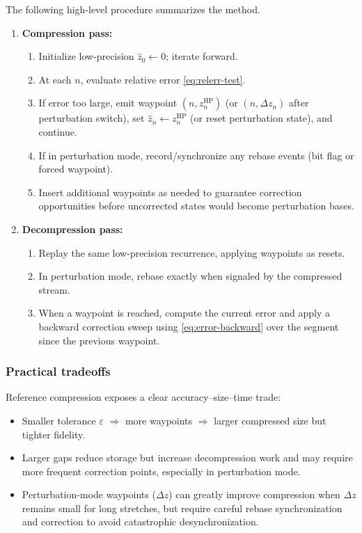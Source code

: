 The following high-level procedure summarizes the method.

\begin{enumerate}
  \item \textbf{Compression pass:}
    \begin{enumerate}
      \item Initialize low-precision \(\hat z_0 \leftarrow 0\); iterate forward.
      \item At each \(n\), evaluate relative error \eqref{eq:relerr-test}.
      \item If error too large, emit waypoint \((n, z_n^{\mathrm{HP}})\) (or \((n,\Delta z_n)\) after perturbation switch),
            set \(\hat z_n \leftarrow z_n^{\mathrm{HP}}\) (or reset perturbation state), and continue.
      \item If in perturbation mode, record/synchronize any rebase events (bit flag or forced waypoint).
      \item Insert additional waypoints as needed to guarantee correction opportunities before uncorrected
            states would become perturbation bases.
    \end{enumerate}

  \item \textbf{Decompression pass:}
    \begin{enumerate}
      \item Replay the same low-precision recurrence, applying waypoints as resets.
      \item In perturbation mode, rebase exactly when signaled by the compressed stream.
      \item When a waypoint is reached, compute the current error and apply a backward correction sweep
            using \eqref{eq:error-backward} over the segment since the previous waypoint.
    \end{enumerate}
\end{enumerate}

\subsubsection{Practical tradeoffs}

Reference compression exposes a clear accuracy--size--time trade:
\begin{itemize}
  \item Smaller tolerance \(\varepsilon\) \(\Rightarrow\) more waypoints \(\Rightarrow\) larger compressed size but tighter fidelity.
  \item Larger gaps reduce storage but increase decompression work and may require more frequent correction points,
        especially in perturbation mode.
  \item Perturbation-mode waypoints (\(\Delta z\)) can greatly improve compression when \(\Delta z\) remains small for long
        stretches, but require careful rebase synchronization and correction to avoid catastrophic desynchronization.
\end{itemize}

